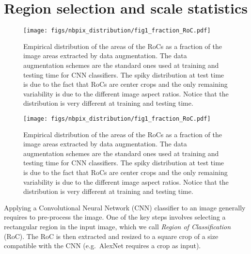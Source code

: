 \documentclass{article}
\begin{document}
 \section{Region selection and scale statistics}\label{sec:analysis}

\ifnips 
\begin{figure}[t]
\centering
\begin{minipage}{0.48\linewidth}
\texttt{[image: figs/nbpix\_distribution/fig1\_fraction\_RoC.pdf]}
\end{minipage}
\hfill
\raisebox{0.6em}
{
\begin{minipage}{0.48\linewidth}
\caption{\label{fig:pdfresolution}
Empirical distribution of the areas of the RoCs as a fraction of the image areas extracted by data augmentation. 
The data augmentation schemes are the standard ones used at training and testing time for CNN classifiers. 
The spiky distribution at test time is due to the fact that RoCs are center crops and the only remaining variability is due to the different image aspect ratios.
Notice that the distribution is very different at training and testing time.}
\end{minipage}}
\end{figure}

\else
\begin{figure}[t]
\texttt{[image: figs/nbpix\_distribution/fig1\_fraction\_RoC.pdf]}
\caption{\label{fig:pdfresolution}
Empirical distribution of the areas of the RoCs as a fraction of the image areas extracted by data augmentation. 
The data augmentation schemes are the standard ones used at training and testing time for CNN classifiers. 
The spiky distribution at test time is due to the fact that RoCs are center crops and the only remaining variability is due to the different image aspect ratios.
Notice that the distribution is very different at training and testing time.}
\end{figure}
\fi \iffalse
\begin{figure}
\begin{center}
\end{center}
\caption{\label{fig:resolution}}
\end{figure}
\fi 
Applying a Convolutional Neural Network (CNN) classifier to an image generally requires to pre-process the image.
One of the key steps involves selecting a rectangular region in the input image, which we call \emph{Region of Classification} (RoC).
The RoC is then extracted and resized to a square crop of a size compatible with the CNN{} (e.g.~AlexNet requires a  crop as input).
\end{document}
